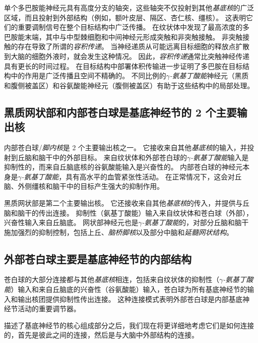 单个多巴胺能神经元具有高度分支的轴突，这些轴突不仅投射到其他\textit{基底核}的广泛区域，而且投射到外部结构（例如，额叶皮层、隔区、杏仁核、缰核）。
这表明它们的重要调制信号在整个目标结构中广泛传播。
在纹状体中发现了最高浓度的多巴胺能末端，其中与中型棘细胞和中间神经元形成突触和非突触接触。
非突触接触的存在导致了所谓的\textit{容积传递}。
当神经递质从可能远离目标细胞的释放点扩散到大脑的细胞外液时，就会发生这种情况。
因此，\textit{容积传递}通常比突触神经传递具有更长的时间过程。
在目标结构中部署体积传输进一步证明了多巴胺在目标结构中的作用是广泛传播且空间不精确的。
不同比例的\textit{$\gamma$-氨基丁酸能}神经元（黑质和腹侧被盖区）和谷氨酸能神经元（腹侧被盖区）有助于这些结构中的局部处理。



\subsection{黑质网状部和内部苍白球是基底神经节的 2 个主要输出核}

内部苍白球/\textit{脚内核}是 2 个主要输出核之一。
它接收来自其他\textit{基底核}的输入，并投射到丘脑和脑干中的外部目标。
来自纹状体和外部苍白球的\textit{$\gamma$-氨基丁酸能}输入是抑制性的，而来自丘脑底核的谷氨酸能输入是兴奋性的。
内部苍白球的神经元本身是\textit{$\gamma$-氨基丁酸能}，具有高水平的血管紧张性活动。
在正常情况下，这会对丘脑、外侧缰核和脑干中的目标产生强大的抑制作用。


黑质网状部是第二个主要输出核。
它还接收来自其他\textit{基底核}的传入，并提供与丘脑和脑干的传出连接。
抑制性（氨基丁酸能）输入来自纹状体和苍白球（外部），兴奋性输入来自丘脑底。
网状部神经元也是\textit{$\gamma$-氨基丁酸能}的，对部分丘脑和脑干施加强烈的抑制控制，包括上丘、\textit{脑桥脚核}以及部分中脑和\textit{延髓网状结构}。



\subsection{外部苍白球主要是基底神经节的内部结构}

苍白球的大部分连接都与其他\textit{基底核}相连，包括来自纹状体的抑制性（\textit{$\gamma$-氨基丁酸能}）输入和来自丘脑底的兴奋性（谷氨酸能）输入，苍白球为所有基底神经节的输入和输出核团提供抑制性传出连接。
这种连接模式表明外部苍白球是内部基底神经节活动的重要调节器。


描述了基底神经节的核心组成部分之后，我们现在将更详细地考虑它们是如何连接的，首先是彼此之间的连接，然后是与大脑中外部结构的连接。



